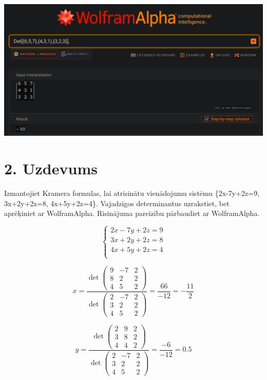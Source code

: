 \documentclass{article}
\begin{document}
\includegraphics[width=\textwidth]{1}

\clearpage

\section*{2. Uzdevums}
Izmantojiet Kramera formulas, lai atrisinātu vienādojumu sistēmu \{2x-7y+2z=9, 3x+2y+2z=8, 4x+5y+2z=4\}. Vajadzīgos determinantus uzrakstiet, bet aprēķiniet ar WolframAlpha. Risinājuma pareizību pārbaudiet ar WolframAlpha.

\begin{equation*}
    \begin{cases}
        2x - 7y + 2z = 9\\
        3x + 2y + 2z = 8\\
        4x + 5y + 2z = 4\\
    \end{cases}
\end{equation*}

\begin{equation*}
    x
    = 
    \frac
    {
        \det
        \begin{pmatrix}
            9 & -7 & 2\\
            8 & 2 & 2\\
            4 & 5 & 2
        \end{pmatrix}
    }
    {
        \det
        \begin{pmatrix}
            2 & -7 & 2\\
            3 & 2 & 2\\
            4 & 5 & 2
        \end{pmatrix}
    }
    =
    \frac{66}{-12}
    =
    - \frac{11}{2}
\end{equation*}

\begin{equation*}
    y
    = 
    \frac
    {
        \det
        \begin{pmatrix}
            2 & 9 & 2\\
            3 & 8 & 2\\
            4 & 4 & 2
        \end{pmatrix}
    }
    {
        \det
        \begin{pmatrix}
            2 & -7 & 2\\
            3 & 2 & 2\\
            4 & 5 & 2
        \end{pmatrix}
    }
    =
    \frac{-6}{-12}
    =
    0.5
\end{equation*}
\end{document}

